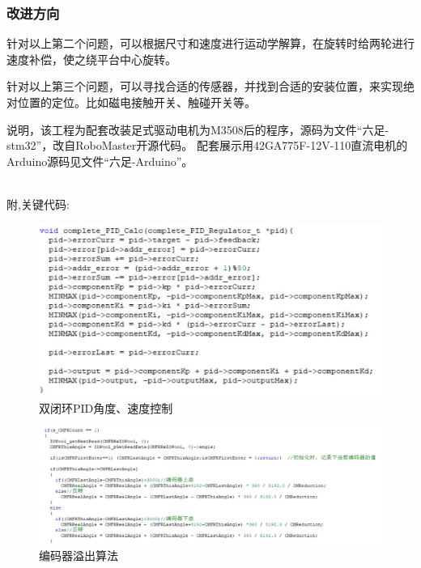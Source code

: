 \documentclass[a4paper, 11pt]{article}   %
\begin{document}
\begin{CJK}{UTF8}{gbsn}
\begin{spacing}{1.15}
\subsubsection{改进方向}
针对以上第二个问题，可以根据尺寸和速度进行运动学解算，在旋转时给两轮进行速度补偿，使之绕平台中心旋转。\par
针对以上第三个问题，可以寻找合适的传感器，并找到合适的安装位置，来实现绝对位置的定位。比如磁电接触开关、触碰开关等。\par
说明，该工程为配套改装足式驱动电机为M3508后的程序，源码为文件“六足-stm32”，改自RoboMaster开源代码。 配套展示用42GA775F-12V-110直流电机的Arduino源码见文件“六足-Arduino”。\par
~\\
附,关键代码:
 \begin{figure}[H]
\centering
\includegraphics[width=.9\textwidth]{chap5//fig7.jpg}
\caption{双闭环PID角度、速度控制}
\end{figure}
 \begin{figure}[H]
\centering
\includegraphics[width=.9\textwidth]{chap5//fig8.jpg}
\caption{编码器溢出算法}
\end{figure}

\end{spacing}
\end{CJK}
\end{document}
